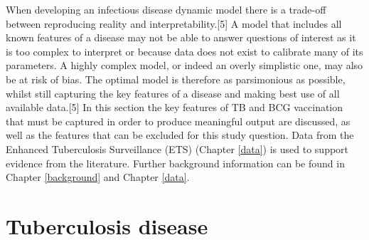 \documentclass[11pt,twoside]{bristolthesis}
\begin{document}
  When developing an infectious disease dynamic model there is a trade-off between reproducing reality and interpretability.{[}5{]} A model that includes all known features of a disease may not be able to answer questions of interest as it is too complex to interpret or because data does not exist to calibrate many of its parameters. A highly complex model, or indeed an overly simplistic one, may also be at risk of bias. The optimal model is therefore as parsimonious as possible, whilst still capturing the key features of a disease and making best use of all available data.{[}5{]} In this section the key features of TB and BCG vaccination that must be captured in order to produce meaningful output are discussed, as well as the features that can be excluded for this study question. Data from the Enhanced Tuberculosis Surveillance (ETS) (Chapter \ref{data}) is used to support evidence from the literature. Further background information can be found in Chapter \ref{background} and Chapter \ref{data}.
  
  \hypertarget{tuberculosis-disease}{%
  \section{Tuberculosis disease}\label{tuberculosis-disease}}
  
\end{document}
